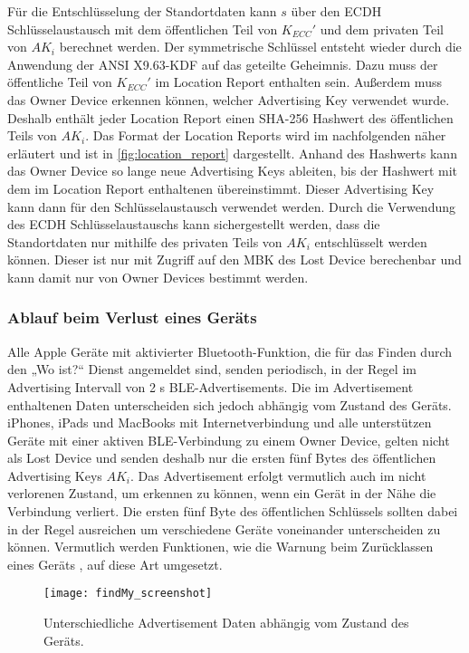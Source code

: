 Für die Entschlüsselung der Standortdaten kann $s$ über den \ac{ECDH} Schlüsselaustausch mit dem öffentlichen Teil von $K_{ECC}'$ und dem privaten Teil von $AK_i$ berechnet werden.
Der symmetrische Schlüssel entsteht wieder durch die Anwendung der ANSI X9.63-\ac{KDF} auf das geteilte Geheimnis.
Dazu muss der öffentliche Teil von $K_{ECC}'$ im Location Report enthalten sein.
Außerdem muss das Owner Device erkennen können, welcher Advertising Key verwendet wurde.
Deshalb enthält jeder Location Report einen \ac{SHA}-256 Hashwert des öffentlichen Teils von $AK_i$.
Das Format der Location Reports wird im nachfolgenden näher erläutert und ist in  \autoref{fig:location_report} dargestellt.
Anhand des Hashwerts kann das Owner Device so lange neue Advertising Keys ableiten, bis der Hashwert mit dem im Location Report enthaltenen übereinstimmt.
Dieser Advertising Key kann dann für den Schlüsselaustausch verwendet werden.
Durch die Verwendung des \ac{ECDH} Schlüsselaustauschs kann sichergestellt werden, dass die Standortdaten nur mithilfe des privaten Teils von $AK_i$ entschlüsselt werden können.
Dieser ist nur mit Zugriff auf den \ac{MBK} des Lost Device berechenbar und kann damit nur von Owner Devices bestimmt werden.

\subsubsection{Ablauf beim Verlust eines Geräts}
\label{sec:Verlust}

Alle Apple Geräte mit aktivierter Bluetooth-Funktion, die für das Finden durch den „Wo ist?“ Dienst angemeldet sind, senden periodisch, in der Regel im Advertising Intervall von 2 s \ac{BLE}-Advertisements.
Die im Advertisement enthaltenen Daten unterscheiden sich jedoch abhängig vom Zustand des Geräts.
iPhones, iPads und MacBooks mit Internetverbindung und alle unterstützen Geräte mit einer aktiven \ac{BLE}-Verbindung zu einem Owner Device, gelten nicht als Lost Device und senden deshalb nur die ersten fünf Bytes des öffentlichen Advertising Keys $AK_i$.
Das Advertisement erfolgt vermutlich auch im nicht verlorenen Zustand, um erkennen zu können, wenn ein Gerät in der Nähe die Verbindung verliert.
Die ersten fünf Byte des öffentlichen Schlüssels sollten dabei in der Regel ausreichen um verschiedene Geräte voneinander unterscheiden zu können.
Vermutlich werden Funktionen, wie die Warnung beim Zurücklassen eines Geräts \cite{Apple_FindMyWarning}, auf diese Art umgesetzt.
\begin{figure}[ht]
    \centering
    \texttt{[image: findMy\_screenshot]}
    \caption{Unterschiedliche Advertisement Daten abhängig vom Zustand des Geräts.}
    \label{fig:findMy_screenshot}
\end{figure}

